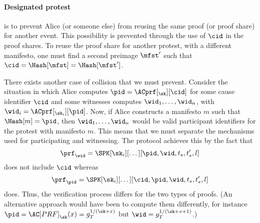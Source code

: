 \paragraph{Designated protest}%
\label{analysis-designated}

 is to prevent Alice (or someone else) from reusing the same proof (or proof share) for another event.
This possibility is prevented through the use of \(\cid\) in the proof shares.
To reuse the proof share for another protest, with a different manifesto, one must find a second preimage \(\mfst'\) such that \(\cid = \Hash[\mfst] = \Hash[\mfst']\).

There exists another case of collision that we must prevent.
Consider the situation in which Alice computes \(\pid = \ACprf[_\sk][\cid]\) for some cause identifier \(\cid\) and some witnesses computes \(\wid_1, \dotsc, \wid_n\), with \(\wid_i = \ACprf[_{\sk_i}][\pid]\).
Now, if Alice constructs a manifesto \(m\) such that \(\Hash[m] = \pid\), then \(\wid_1, \dotsc, \wid_n\) would be valid participant identifiers for the protest with manifesto \(m\).
This means that we must separate the mechanisms used for participating and witnessing.
The protocol achieves this by the fact that \[
  \prf_{\wid} = \SPK[\sk_i][\dotsc][\pid, \wid, t_s, t_s', l]
\]
does not include \(\cid\) whereas \[
  \prf_{\pid} = \SPK[\sk_i][\dotsc][\cid, \pid, \wid, t_s, t_s', l]
\]
does.
Thus, the verification process differs for the two types of proofs.
(An alternative approach would have been to compute them differently, for instance \(\pid = \AC[PRF]_{\sk}(x) = g_T^{1/(\sk+x)}\) but \(\wid = g_T^{1/(\sk+x+1)}\).)

%
%

